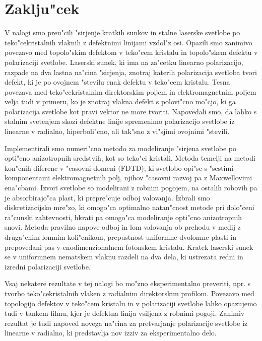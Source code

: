 \documentclass[12pt,twoside,openright,final,a4paper]{report}
\begin{document}
\chapter{Zaklju"cek}
V nalogi smo preu"cili "sirjenje kratkih sunkov in stalne laserske svetlobe po teko"cekristalnih vlaknih z defektnimi linijami vzdol"z osi. 
Opazili smo zanimivo povezavo med topolo"skim defektom v teko"cem kristalu in topolo"skem defektu v polarizaciji svetlobe. 
Laserski sunek, ki ima na za"cetku linearno polarizacijo, razpade na dva lastna na"cina "sirjenja, znotraj katerih polarizacija svetloba tvori defekt, ki je po ovojnem "stevilu enak defektu v teko"cem kristalu. 
Tesna povezava med teko"cekristalnim direktorskim poljem in elektromagnetnim poljem velja tudi v primeru, ko je znotraj vlakna defekt s polovi"cno mo"cjo, ki ga polarizacija svetlobe kot pravi vektor ne more tvoriti. 
Napovedali smo, da lahko s stalnim svetenjem skozi defektne linije spremenimo polarizacijo svetlobe iz linearne v radialno, hiperboli"cno, ali tak"sno z vi"sjimi ovojnimi "stevili. 

Implementirali smo numeri"cno metodo za modeliranje "sirjena svetlobe po opti"cno anizotropnih sredstvih, kot so teko"ci kristali. 
Metoda temelji na metodi kon"cnih diferenc v "casovni domeni (FDTD), ki svetlobo opi"se s "sestimi komponentami elektromagnetnih polj, njihov "casovni razvoj pa z Maxwellovimi ena"cbami. 
Izvori svetlobe so modelirani z robnim pogojem, na ostalih robovih pa je absorbirajo"ca plast, ki prepre"cuje odboj valovanja. 
Izbrali smo diskretizacijsko mre"zo, ki omogo"ca optimalno natan"cnost metode pri dolo"ceni ra"cunski zahtevnosti, hkrati pa omogo"ca modeliranje opti"cno anizotropnih snovi. 
Metoda pravilno napove odboj in lom valovanja ob prehodu v medij z druga"cnim lomnim koli"cnikom, prepustnost uniformne dvolomne plasti in prepovedani pas v enodimenzionalnem fotonskem kristalu. 
Kratek laserski sunek se v uniformnem nematskem vlaknu razdeli na dva dela, ki ustrezata redni in izredni polarizaciji svetlobe. 

Vsaj nekatere rezultate v tej nalogi bo mo"zno eksperimentalno preveriti, npr. s tvorbo teko"cekristalnih vlaken z radialnim direktorskim profilom. 
Povezavo med topologijo defektov v teko"cem kristalu in v polarizaciji svetlobe lahko opazujemo tudi v tankem filmu, kjer je defektna linija vsiljena z robnimi pogoji. 
Zanimiv rezultat je tudi napoved novega na"cina za pretvarjanje polarizacije svetlobe iz linearne v radialno, ki predstavlja nov izziv za eksperimentalno delo. 
\end{document}
